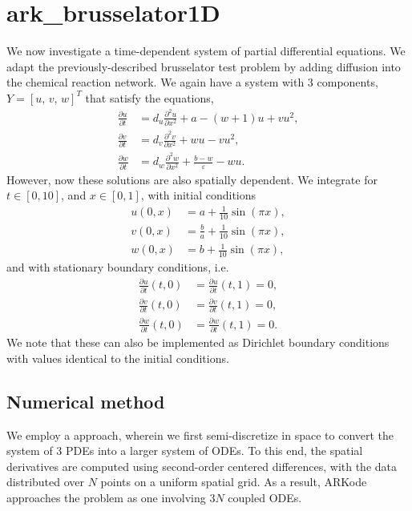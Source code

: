 \documentclass[letterpaper,10pt,english]{sphinxmanual}
\begin{document}
\section{ark\_brusselator1D}
\label{\detokenize{c_serial:ark-brusselator1d}}\label{\detokenize{c_serial:id18}}
We now investigate a time-dependent system of partial differential
equations.  We adapt the previously-described brusselator test problem
by adding diffusion into the chemical reaction network.  We again have
a system with 3 components, \(Y = [u,\, v,\, w]^T\) that satisfy
the equations,
\begin{equation*}
\begin{split}\frac{\partial u}{\partial t} &= d_u \frac{\partial^2 u}{\partial
   x^2} + a - (w+1) u + v u^2, \\
\frac{\partial v}{\partial t} &= d_v \frac{\partial^2 v}{\partial
   x^2} + w u - v u^2, \\
\frac{\partial w}{\partial t} &= d_w \frac{\partial^2 w}{\partial
   x^2} + \frac{b-w}{\varepsilon} - w u.\end{split}
\end{equation*}
However, now these solutions are also spatially dependent.  We
integrate for \(t \in [0, 10]\), and \(x \in [0, 1]\), with
initial conditions
\begin{equation*}
\begin{split}u(0,x) &=  a + \frac{1}{10} \sin(\pi x),\\
v(0,x) &= \frac{b}{a} + \frac{1}{10}\sin(\pi x),\\
w(0,x) &=  b + \frac{1}{10}\sin(\pi x),\end{split}
\end{equation*}
and with stationary boundary conditions, i.e.
\begin{equation*}
\begin{split}\frac{\partial u}{\partial t}(t,0) &= \frac{\partial u}{\partial t}(t,1) = 0,\\
\frac{\partial v}{\partial t}(t,0) &= \frac{\partial v}{\partial t}(t,1) = 0,\\
\frac{\partial w}{\partial t}(t,0) &= \frac{\partial w}{\partial t}(t,1) = 0.\end{split}
\end{equation*}
We note that these can also be implemented as Dirichlet boundary
conditions with values identical to the initial conditions.


\subsection{Numerical method}
\label{\detokenize{c_serial:id19}}
We employ a  approach, wherein we first
semi-discretize in space to convert the system of 3 PDEs into a larger
system of ODEs.  To this end, the spatial derivatives are computed
using second-order centered differences, with the data distributed
over \(N\) points on a uniform spatial grid.  As a result, ARKode
approaches the problem as one involving \(3N\) coupled ODEs.
\end{document}
